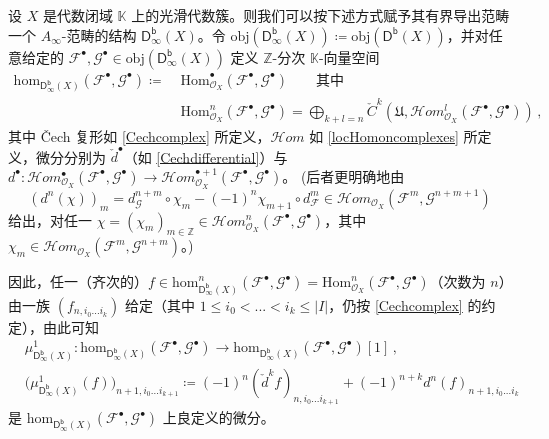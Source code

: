 \begin{Rem}
	设 $X$ 是代数闭域 $\mathbb{K}$ 上的光滑代数簇。则我们可以按下述方式赋予其有界导出范畴一个 $A_\infty$-范畴的结构 $\mathsf{D^b_\infty}(X)$。令 $\text{obj}(\mathsf{D^b_\infty}(X))\coloneqq\text{obj}(\mathsf{D^b}(X))$，并对任意给定的 $\mathcal{F}^\bullet,\mathcal{G}^\bullet\in\text{obj}(\mathsf{D^b_\infty}(X))$ 定义 $\mathbb{Z}$-分次 $\mathbb{K}$-向量空间
	\begin{align*}
		\text{hom}_{\mathsf{D^b_\infty}\!(X)}(\mathcal{F}^\bullet,\mathcal{G}^\bullet)\coloneqq\; &\text{Hom}_{\mathcal{O}_X}^\bullet(\mathcal{F}^\bullet,\mathcal{G}^\bullet)\qquad\text{其中} \\ &\text{Hom}_{\mathcal{O}_X}^n(\mathcal{F}^\bullet,\mathcal{G}^\bullet)=\bigoplus_{k+l=n}\check{C}^k(\mathfrak{U},\mathcal{H}om_{\mathcal{O}_X}^l(\mathcal{F}^\bullet,\mathcal{G}^\bullet))\,,
	\end{align*}
	其中 Čech 复形如 \eqref{Cechcomplex} 所定义，$\mathcal{H}om$ 如 \eqref{locHomoncomplexes} 所定义，微分分别为 $\check{d}^\bullet$（如 \eqref{Cechdifferential}）与 $d^\bullet:\mathcal{H}om_{\mathcal{O}_X}^\bullet(\mathcal{F}^\bullet,\mathcal{G}^\bullet)\rightarrow \mathcal{H}om_{\mathcal{O}_X}^{\bullet+1}(\mathcal{F}^\bullet,\mathcal{G}^\bullet)$。
	\newline\big(后者更明确地由
	\[
	(d^n(\chi))_m=d_\mathcal{G}^{n+m}\circ \chi_m-(-1)^n\chi_{m+1}\circ d_\mathcal{F}^m\in\mathcal{H}om_{\mathcal{O}_X}(\mathcal{F}^m,\mathcal{G}^{n+m+1})
	\]
	给出，对任一 $\chi=(\chi_m)_{m\in\mathbb{Z}}\in\mathcal{H}om_{\mathcal{O}_X}^n(\mathcal{F}^\bullet,\mathcal{G}^\bullet)$，其中 $\chi_m\in\mathcal{H}om_{\mathcal{O}_X}(\mathcal{F}^m,\mathcal{G}^{n+m})$。\big)

	因此，任一（齐次的）$f\in\text{hom}_{\mathsf{D^b_\infty}\!(X)}^n(\mathcal{F}^\bullet,\mathcal{G}^\bullet)=\text{Hom}_{\mathcal{O}_X}^n(\mathcal{F}^\bullet,\mathcal{G}^\bullet)$（次数为 $n$）由一族 $(f_{n,i_0...i_k})$ 给定（其中 $1\leq i_0<...<i_k\leq |I|$，仍按 \eqref{Cechcomplex} 的约定），由此可知
	\begin{align*}
		&\mu_{\mathsf{D^b_\infty}\!(X)}^1:\text{hom}_{\mathsf{D^b_\infty}\!(X)}(\mathcal{F}^\bullet,\mathcal{G}^\bullet)\rightarrow\text{hom}_{\mathsf{D^b_\infty}\!(X)}(\mathcal{F}^\bullet,\mathcal{G}^\bullet)[1]\,, \\
		&\big(\mu_{\mathsf{D^b_\infty}\!(X)}^1(f)\big)_{n\!+\!1,i_0...i_{k+1}}\!\coloneqq\!(-1)^n(\check{d}^kf)_{n,i_0...i_{k+1}}\!+\!(-1)^{n+k} d^n(f)_{n\!+\!1,i_0...i_k}
	\end{align*}
	是 $\text{hom}_{\mathsf{D^b_\infty}\!(X)}(\mathcal{F}^\bullet,\mathcal{G}^\bullet)$ 上良定义的微分。


\end{Rem}
